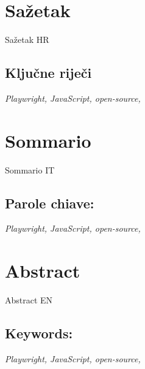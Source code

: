 \section*{Sažetak}\label{sazetak_hr}
Sažetak HR

\subsection*{Ključne riječi}\label{kw_hr}
\textit{Playwright, JavaScript, open-source,}

\section*{Sommario}\label{sazetak_it}
Sommario IT

\subsection*{Parole chiave:}\label{kw_it}
\textit{Playwright, JavaScript, open-source,}

\section*{Abstract}\label{sazetak_en}
Abstract EN

\subsection*{Keywords:}\label{kw_en}
\textit{Playwright, JavaScript, open-source,}